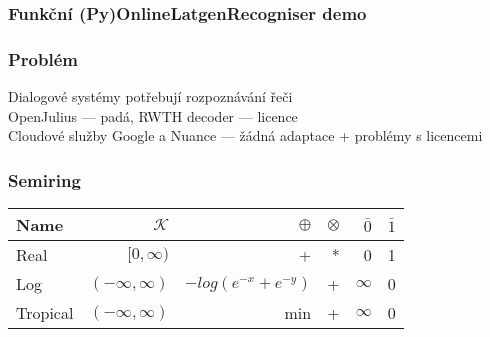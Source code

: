 \begin{frame}\frametitle{Funkční (Py)OnlineLatgenRecogniser demo} 
    \begin{center}
        
    \end{center}
\end{frame}

\begin{frame}\frametitle{Problém} 
    Dialogové systémy potřebují rozpoznávání řeči \\
    OpenJulius --- padá, RWTH decoder --- licence \\
    Cloudové služby Google a Nuance --- žádná adaptace + problémy s licencemi 
\end{frame}

\begin{frame} \frametitle{Semiring}
\begin{tabular}{lrrrrr}
\hline
Name & $\mathcal{K}$ & $\oplus$ & $ \otimes$ & $\bar{0}$ & $\bar{1}$ \\ 
\hline
Real        & $[0,\infty)$        &  +                     &  * &  0        &  1  \\
Log         & $(-\infty, \infty)$ & $-log(e^{-x} + e^{-y})$ & + &  $\infty$ &  0  \\
Tropical    & $(-\infty, \infty)$ &  min                   &  + &  $\infty$ &  0  \\
\hline
\end{tabular}
\end{frame}


